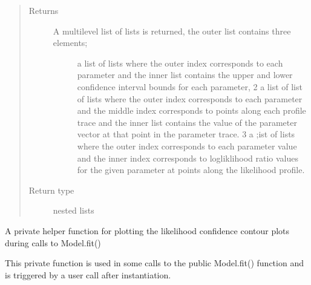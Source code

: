 \documentclass[letterpaper,10pt,english,openany,oneside]{sphinxmanual}
\begin{document}
\begin{fulllineitems}
\begin{fulllineitems}
\begin{quote}
\begin{description}
\item[{Returns}] \leavevmode
\begin{description}
\item[{A multi\sphinxhyphen{}level list of lists is returned, the outer list contains three elements;}]  \sphinxhyphen{} a list of lists where the outer index corresponds to each parameter and the
inner list contains the upper and lower confidence interval bounds for each parameter,
2 \sphinxhyphen{} a list of list of lists where the outer index corresponds to each parameter and
the middle index corresponds to points along each profile trace and the inner list
contains the value of the parameter vector at that point in the parameter trace.
3 \sphinxhyphen{} a ;ist of lists where the outer index corresponds to each parameter value and
the inner index corresponds to logliklihood ratio values for the given parameter
at points along the likelihood profile.

\end{description}


\item[{Return type}] \leavevmode
nested lists

\end{description}\end{quote}

\end{fulllineitems}


\begin{fulllineitems}
\label{\detokenize{nloed:nloed.model.Model.__contour_plot}}
A private helper function for plotting the likelihood confidence contour plots during
calls to Model.fit()

This private function is used in some calls to the public Model.fit() function and is
triggered by a user call after instantiation.


\end{fulllineitems}
\end{fulllineitems}
\end{document}
